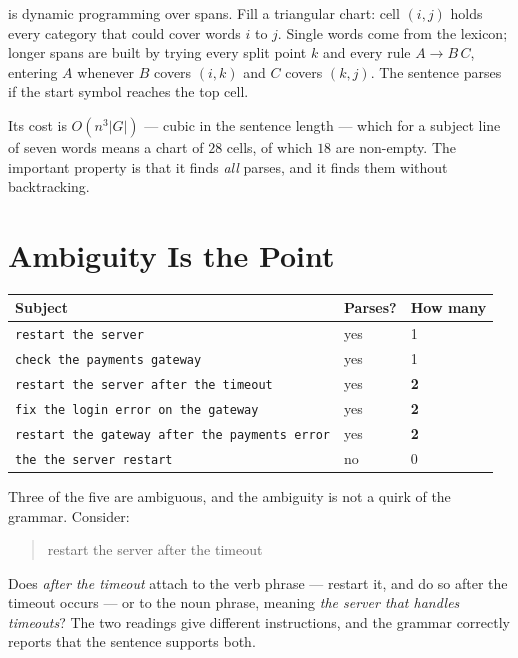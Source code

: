  is dynamic programming over spans. Fill a triangular chart: cell
$(i,j)$ holds every category that could cover words $i$ to $j$. Single words come
from the lexicon; longer spans are built by trying every split point $k$ and every
rule $A \to B\,C$, entering $A$ whenever $B$ covers $(i,k)$ and $C$ covers
$(k,j)$. The sentence parses if the start symbol reaches the top cell.

Its cost is $O(n^{3}|G|)$ --- cubic in the sentence length --- which for a subject
line of seven words means a chart of $28$ cells, of which $18$ are non-empty. The
important property is that it finds \emph{all} parses, and it finds them without
backtracking.

\section{Ambiguity Is the Point}

\begin{examplebox}
\begin{tabular}{@{}L{8.7cm}L{2.0cm}L{3.0cm}@{}}
\toprule
\textbf{Subject} & \textbf{Parses?} & \textbf{How many} \\
\midrule
\texttt{restart the server} & yes & 1 \\
\texttt{check the payments gateway} & yes & 1 \\
\texttt{restart the server after the timeout} & yes & \textbf{2} \\
\texttt{fix the login error on the gateway} & yes & \textbf{2} \\
\texttt{restart the gateway after the payments error} & yes & \textbf{2} \\
\midrule
\texttt{the the server restart} & no & 0 \\
\bottomrule
\end{tabular}
\end{examplebox}

Three of the five are ambiguous, and the ambiguity is not a quirk of the grammar.
Consider:

\begin{quote}\ttfamily\small
restart the server after the timeout
\end{quote}

Does \emph{after the timeout} attach to the verb phrase --- restart it, and do so
after the timeout occurs --- or to the noun phrase, meaning \emph{the server that
handles timeouts}? The two readings give different instructions, and the grammar
correctly reports that the sentence supports both.

